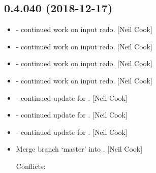 \documentclass[a4paper,10pt,english]{report}
\begin{document}
\subsection{0.4.040 (2018-12-17)}
\label{\detokenize{misc/changelog:id229}}\begin{itemize}
\item {} 
 - continued work on input redo. {[}Neil Cook{]}

\item {} 
 - continued work on input redo. {[}Neil Cook{]}

\item {} 
 - continued work on input redo. {[}Neil Cook{]}

\item {} 
 - continued work on input redo. {[}Neil Cook{]}

\item {} 
 - continued update for . {[}Neil Cook{]}

\item {} 
 - continued update for . {[}Neil Cook{]}

\item {} 
 - continued update for . {[}Neil Cook{]}

\item {} 
Merge branch ‘master’ into . {[}Neil Cook{]}
\begin{description}
\item[{Conflicts:}] \leavevmode
{}

\end{description}

\end{itemize}
\end{document}
